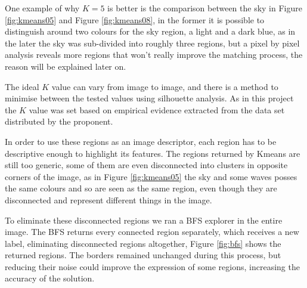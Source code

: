 \documentclass[12pt,a4paper]{article}
\begin{document}
	One example of why $K = 5$ is better is the comparison between the sky in Figure \ref{fig:kmeans05} and Figure \ref{fig:kmeans08}, in the former it is possible to distinguish around two colours for the sky region, a light and a dark blue, as in the later the sky was sub-divided into roughly three regions, but a pixel by pixel analysis reveals more regions that won't really improve the matching process, the reason will be explained later on.

	The ideal $K$ value can vary from image to image, and there is a method to minimise between the tested values using silhouette analysis. As in this project the $K$ value was set based on empirical evidence extracted from the data set distributed by the proponent.

	In order to use these regions as an image descriptor, each region has to be descriptive enough to highlight its features. The regions returned by Kmeans are still too generic, some of them are even disconnected into clusters in opposite corners of the image, as in Figure \ref{fig:kmeans05} the sky and some waves posses the same colours and so are seen as the same region, even though they are disconnected and represent different things in the image.

\newpage

	To eliminate these disconnected regions we ran a BFS explorer in the entire image. The BFS returns every connected region separately, which receives a new label, eliminating disconnected regions altogether, Figure \ref{fig:bfs} shows the returned regions.
	The borders remained unchanged during this process, but reducing their noise could improve the expression of some regions, increasing the accuracy of the solution.
\end{document}
